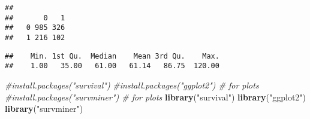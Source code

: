 \documentclass[
  10pt,
]{book}
\newenvironment{Shaded}{\begin{snugshade}}{\end{snugshade}}
\newcommand{\CommentTok}[1]{\textcolor[rgb]{0.56,0.35,0.01}{\textit{#1}}}
\newcommand{\DecValTok}[1]{\textcolor[rgb]{0.00,0.00,0.81}{#1}}
\newcommand{\KeywordTok}[1]{\textcolor[rgb]{0.13,0.29,0.53}{\textbf{#1}}}
\newcommand{\NormalTok}[1]{#1}
\newcommand{\OperatorTok}[1]{\textcolor[rgb]{0.81,0.36,0.00}{\textbf{#1}}}
\newcommand{\StringTok}[1]{\textcolor[rgb]{0.31,0.60,0.02}{#1}}
\begin{document}
\begin{Shaded}
\end{Shaded}

\begin{verbatim}
##    
##       0   1
##   0 985 326
##   1 216 102
\end{verbatim}

\begin{Shaded}
\end{Shaded}

\begin{verbatim}
##    Min. 1st Qu.  Median    Mean 3rd Qu.    Max. 
##    1.00   35.00   61.00   61.14   86.75  120.00
\end{verbatim}

\begin{Shaded}
\begin{Highlighting}[]
\CommentTok{#install.packages("survival")}
\CommentTok{#install.packages("ggplot2") # for plots}
\CommentTok{#install.packages("survminer") # for plots}
\KeywordTok{library}\NormalTok{(}\StringTok{"survival"}\NormalTok{)}
\KeywordTok{library}\NormalTok{(}\StringTok{"ggplot2"}\NormalTok{)}
\KeywordTok{library}\NormalTok{(}\StringTok{"survminer"}\NormalTok{)}
\end{Highlighting}
\end{Shaded}
\end{document}
